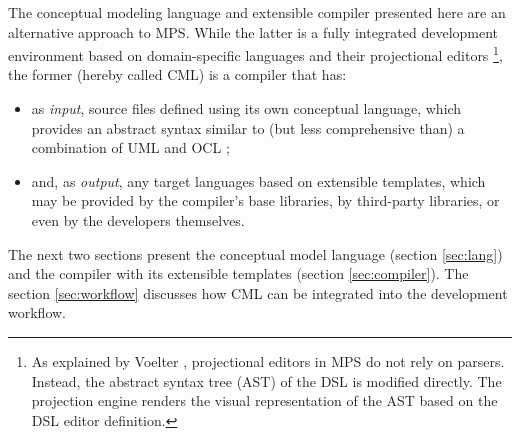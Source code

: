 The conceptual modeling language and extensible compiler presented here are an alternative approach to MPS.
While the latter is a fully integrated development environment based on domain-specific languages and their projectional editors \footnote{As explained by Voelter \cite{voelter}, projectional editors in MPS do not rely on parsers. Instead, the abstract syntax tree (AST) of the DSL is modified directly. The projection engine renders the visual representation of the AST based on the DSL editor definition.}, the former (hereby called CML) is a compiler that has:
\begin{itemize}
\item as \emph{input}, source files defined using its own conceptual language, which provides an abstract syntax similar to (but less comprehensive than) a combination of UML \cite{uml} and OCL \cite{ocl}; 
\item and, as \emph{output}, any target languages based on extensible templates, which may be provided by the compiler's base libraries, by third-party libraries, or even by the developers themselves.
\end{itemize}

The next two sections present the conceptual model language (section \ref{sec:lang}) and the compiler with its extensible templates (section \ref{sec:compiler}). The section \ref{sec:workflow} discusses how CML can be integrated into the development workflow.
